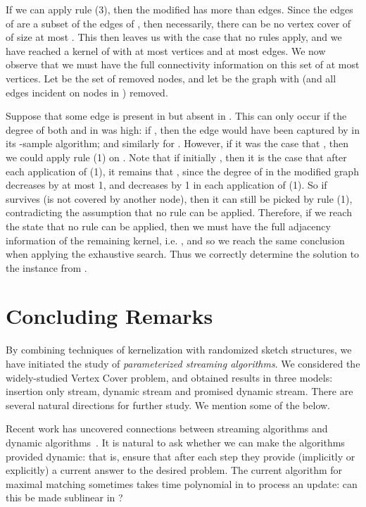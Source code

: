 \documentclass[11pt,letter]{article}
\renewcommand{\paragraph}[1]{\medskip \noindent {\bf #1}}
\begin{document}
{If we can apply rule (3), then the modified  has more than 
edges.  Since the edges of  are a subset of the edges of , then
necessarily, there can be no vertex cover of  of size at most
.
This then leaves us with the case that no rules apply, and we have
reached a kernel of   with at most  vertices and at most  edges.
We now observe that we must have the full connectivity information on
this set of at most  vertices.
Let  be the set of removed nodes, and let  be the
graph  with  (and all edges incident on nodes in ) removed.

Suppose that some edge  is present in  but
absent in .
This can only occur if the degree of both  and  in  was high:
if , then the edge  would have been captured by  in its
-sample algorithm; and similarly for .
However, if it was the case that , then we could apply rule
(1) on .
Note that if initially , then it is the case that after each
application of (1), it remains that , since the degree of
 in the modified graph decreases by at most 1, and  decreases
by 1 in each application of (1).
So if  survives (is not covered by another node), then it can still
be picked by rule (1), contradicting the assumption that no rule can
be applied.
Therefore, if we reach the state that no rule can be applied, then we
must have the full adjacency information of the remaining kernel,
i.e. , and so we reach the same
conclusion when applying the exhaustive search.
Thus we correctly determine the solution to the  instance from
.
}



\section{Concluding Remarks}

By combining techniques of kernelization with randomized sketch structures, we have initiated the study of \emph{parameterized streaming algorithms}. We considered the widely-studied Vertex Cover problem, and obtained results in three models: insertion only stream, dynamic stream and promised dynamic stream.
There are several natural directions for further study. We mention some of the below.

\paragraph{Dynamic Algorithms.} Recent work has uncovered connections between streaming algorithms and
dynamic algorithms~\cite{KKM13}.
It is natural to ask whether we can make the algorithms provided
dynamic: that is, ensure that after each step they provide (implicitly
or explicitly) a current answer to the desired problem.
The current algorithm for maximal matching sometimes takes time
polynomial in  to process an update: can this be made sublinear in
?
\end{document}
